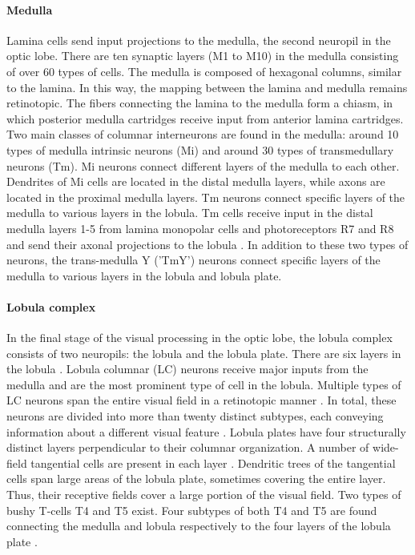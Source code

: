 \paragraph{Medulla}
Lamina cells send input projections to the medulla, the second neuropil in the optic lobe. There are ten synaptic layers (M1 to M10) in the medulla consisting of over 60 types of cells. The medulla is composed of hexagonal columns, similar to the lamina. In this way, the mapping between the lamina and medulla remains retinotopic. The fibers connecting the lamina to the medulla form a chiasm, in which posterior medulla cartridges receive input from anterior lamina cartridges. Two main classes of columnar interneurons are found in the medulla: around 10 types of medulla intrinsic neurons (Mi) and around 30 types of transmedullary neurons (Tm). Mi neurons connect different layers of the medulla to each other. Dendrites of Mi cells are located in the distal medulla layers, while axons are located in the proximal medulla layers. Tm neurons connect specific layers of the medulla to various layers in the lobula. Tm cells receive input in the distal medulla layers 1-5 from lamina monopolar cells and photoreceptors R7 and R8 and send their axonal projections to the lobula \parencite{Fischbach1989, Takemura2011}. In addition to these two types of neurons, the trans-medulla Y ('TmY') neurons connect specific layers of the medulla to various layers in the lobula and lobula plate.

\paragraph{Lobula complex}
In the final stage of the visual processing in the optic lobe, the lobula complex consists of two neuropils: the lobula and the lobula plate. There are six layers in the lobula \parencite{Fischbach1989}. Lobula columnar (LC) neurons receive major inputs from the medulla and are the most prominent type of cell in the lobula. Multiple types of LC neurons span the entire visual field in a retinotopic manner \parencite{Otsuna2006}. In total, these neurons are divided into more than twenty distinct subtypes, each conveying information about a different visual feature \parencite{Wu2016}. Lobula plates have four structurally distinct layers perpendicular to their columnar organization. A number of wide-field tangential cells are present in each layer \parencite{Strausfeld1991}. Dendritic trees of the tangential cells span large areas of the lobula plate, sometimes covering the entire layer. Thus, their receptive fields cover a large portion of the visual field. Two types of bushy T-cells T4 and T5 exist. Four subtypes of both T4 and T5 are found connecting the medulla and lobula respectively to the four layers of the lobula plate \parencite{Fischbach1989}.

